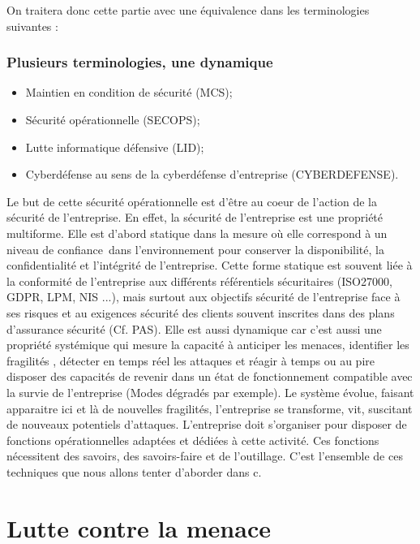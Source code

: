 On traitera donc cette partie avec une équivalence dans les terminologies suivantes :

\begin{frame}
\frametitle<presentation>{Plusieurs terminologies, une dynamique}
	\begin{itemize}
		\item Maintien en condition de sécurité (MCS);
		\item Sécurité opérationnelle (SECOPS);
		\item Lutte informatique défensive (LID);
		\item Cyberdéfense au sens de la cyberdéfense d'entreprise (CYBERDEFENSE).
	\end{itemize}
\end{frame}

Le but de cette sécurité opérationnelle est d’être au coeur de l’action de la sécurité de l’entreprise. En effet, la sécurité de l’entreprise est une propriété multiforme. Elle est d’abord statique dans la mesure où elle correspond à un niveau de confiance dans l’environnement pour conserver la disponibilité, la confidentialité et l’intégrité de l’entreprise. Cette forme statique est souvent liée à la conformité de l’entreprise aux différents référentiels sécuritaires (ISO27000, GDPR, LPM, NIS ...), mais surtout aux objectifs sécurité de l'entreprise face à ses risques et au exigences sécurité des clients souvent inscrites dans des plans d’assurance sécurité (Cf. PAS). 
Elle est aussi dynamique car c’est aussi une propriété systémique qui mesure la capacité à anticiper les menaces, identifier les fragilités , détecter en temps réel les attaques et réagir à temps ou au pire disposer des capacités de revenir dans un état de fonctionnement compatible avec la survie de l’entreprise (Modes dégradés par exemple).
Le système évolue, faisant apparaitre ici et là de nouvelles fragilités, l’entreprise se transforme, vit, suscitant de nouveaux potentiels d’attaques. L’entreprise doit s’organiser pour disposer de fonctions opérationnelles adaptées et dédiées à cette activité. Ces fonctions nécessitent des savoirs, des savoirs-faire et de l’outillage. C’est l’ensemble de ces techniques que nous allons tenter d’aborder dans c\edoc.

\section{Lutte contre la menace}

